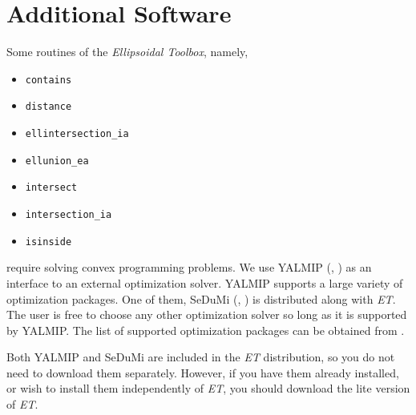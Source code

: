 \section{Additional Software}
Some routines of the {\it Ellipsoidal Toolbox}, namely,
\begin{itemize}
\item {\tt contains}
\item {\tt distance}
\item {\tt ellintersection\_ia}
\item {\tt ellunion\_ea}
\item {\tt intersect}
\item {\tt intersection\_ia}
\item {\tt isinside}
\end{itemize}
require solving convex programming problems.
We use YALMIP (\cite{yalmip}, \cite{yalmiphp}) as an
interface to an external optimization solver.
YALMIP supports a large variety of optimization packages.
One of them, SeDuMi (\cite{sedumi}, \cite{sedumihp}) is distributed
along with {\it ET}.
The user is free to choose any other optimization solver so long
as it is supported by YALMIP.
The list of supported optimization packages can be
obtained from \cite{yalmiphp}.

Both YALMIP and SeDuMi are included in the {\it ET} distribution, so you
do not need to download them separately. However, if you have them already
installed, or wish to install them independently of {\it ET}, you should
download the lite version of {\it ET}.


